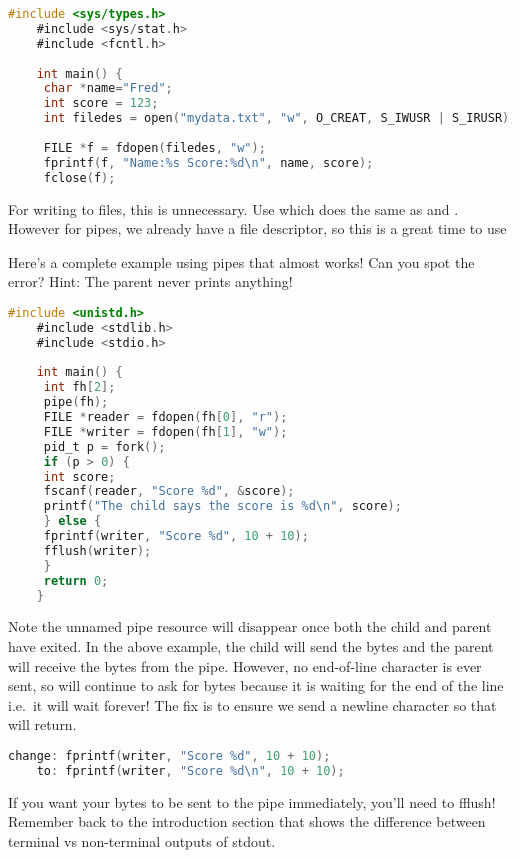 	\begin{lstlisting}[language=C]
	#include <sys/types.h>
	#include <sys/stat.h>
	#include <fcntl.h>
	 
	int main() {
	 char *name="Fred";
	 int score = 123;
	 int filedes = open("mydata.txt", "w", O_CREAT, S_IWUSR | S_IRUSR);
	 
	 FILE *f = fdopen(filedes, "w");
	 fprintf(f, "Name:%s Score:%d\n", name, score);
	 fclose(f);
	\end{lstlisting}
	 
	For writing to files, this is unnecessary.
	Use  which does the same as  and .
	However for pipes, we already have a file descriptor, so this is a great time to use 
	 
	Here's a complete example using pipes that almost works!
	Can you spot the error?
	Hint: The parent never prints anything!
	 
	\begin{lstlisting}[language=C]
	#include <unistd.h>
	#include <stdlib.h>
	#include <stdio.h>
	 
	int main() {
	 int fh[2];
	 pipe(fh);
	 FILE *reader = fdopen(fh[0], "r");
	 FILE *writer = fdopen(fh[1], "w");
	 pid_t p = fork();
	 if (p > 0) {
	 int score;
	 fscanf(reader, "Score %d", &score);
	 printf("The child says the score is %d\n", score);
	 } else {
	 fprintf(writer, "Score %d", 10 + 10);
	 fflush(writer);
	 }
	 return 0;
	}
	\end{lstlisting}
	 
	Note the unnamed pipe resource will disappear once both the child and parent have exited.
	In the above example, the child will send the bytes and the parent will receive the bytes from the pipe.
	However, no end-of-line character is ever sent, so  will continue to ask for bytes because it is waiting for the end of the line i.e.~it will wait forever! The fix is to ensure we send a newline character so that  will return.
	 
	\begin{lstlisting}[language=C]
	change: fprintf(writer, "Score %d", 10 + 10);
	to: fprintf(writer, "Score %d\n", 10 + 10);
	\end{lstlisting}
	 
	If you want your bytes to be sent to the pipe immediately, you'll need to fflush!
	Remember back to the introduction section that shows the difference between terminal vs non-terminal outputs of stdout.
	 

